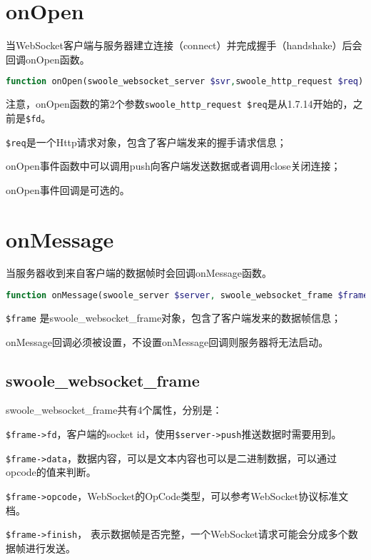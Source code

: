 \section{onOpen}

当WebSocket客户端与服务器建立连接（connect）并完成握手（handshake）后会回调onOpen函数。


\begin{lstlisting}[language=PHP]
function onOpen(swoole_websocket_server $svr,swoole_http_request $req)
\end{lstlisting}

注意，onOpen函数的第2个参数\texttt{swoole\_http\_request \$req}是从1.7.14开始的，之前是\texttt{\$fd}。

\begin{compactitem}
\item \texttt{\$req}是一个Http请求对象，包含了客户端发来的握手请求信息；
\item onOpen事件函数中可以调用push向客户端发送数据或者调用close关闭连接；
\item onOpen事件回调是可选的。
\end{compactitem}

\section{onMessage}

当服务器收到来自客户端的数据帧时会回调onMessage函数。



\begin{lstlisting}[language=PHP]
function onMessage(swoole_server $server, swoole_websocket_frame $frame)
\end{lstlisting}

\begin{compactitem}
\item \texttt{\$frame} 是swoole\_websocket\_frame对象，包含了客户端发来的数据帧信息；
\item onMessage回调必须被设置，不设置onMessage回调则服务器将无法启动。
\end{compactitem}

\subsection{swoole\_websocket\_frame}

swoole\_websocket\_frame共有4个属性，分别是：

\begin{compactitem}
\item \texttt{\$frame->fd}，客户端的socket id，使用\texttt{\$server->push}推送数据时需要用到。
\item \texttt{\$frame->data}，数据内容，可以是文本内容也可以是二进制数据，可以通过opcode的值来判断。
\item \texttt{\$frame->opcode}，WebSocket的OpCode类型，可以参考WebSocket协议标准文档。
\item \texttt{\$frame->finish}， 表示数据帧是否完整，一个WebSocket请求可能会分成多个数据帧进行发送。
\end{compactitem}

